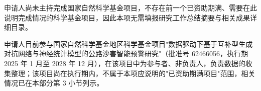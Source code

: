 \justifying
\NSFCBodyText

申请人尚未主持完成国家自然科学基金项目，不存在前一个已资助期满、需要在此说明完成情况的科学基金项目，因此本项无需填报研究工作总结摘要与相关成果详细目录。

申请人目前参与国家自然科学基金地区科学基金项目"数据驱动下基于互补型生成对抗网络与神经统计模型的公路沙害智能预警研究"（批准号 62466056，执行期 2025 年 1 月至 2028 年 12 月），在该项目中为参与者、非负责人，负责数据的收集整理；该项目尚在执行期内，不属于本项应说明的"已资助期满项目"范围，相关情况已在本部分第 3 小节列示。
